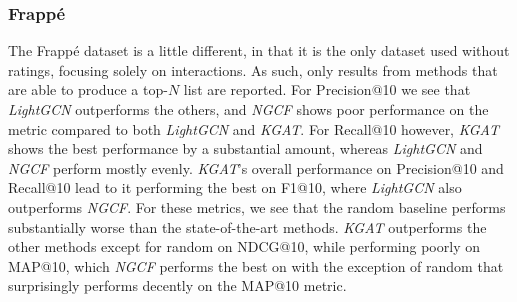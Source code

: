 \subsubsection{Frappé}
The Frappé dataset is a little different, in that it is the only dataset used without ratings, focusing solely on interactions.
As such, only results from methods that are able to produce a top-$N$ list are reported.
For Precision@10 we see that \textit{LightGCN} outperforms the others, and \textit{NGCF} shows poor performance on the metric compared to both \textit{LightGCN} and \textit{KGAT}.
For Recall@10 however, \textit{KGAT} shows the best performance by a substantial amount, whereas \textit{LightGCN} and \textit{NGCF} perform mostly evenly.
\textit{KGAT}'s overall performance on Precision@10 and Recall@10 lead to it performing the best on F1@10, where \textit{LightGCN} also outperforms \textit{NGCF}.
For these metrics, we see that the random baseline performs substantially worse than the state-of-the-art methods.
\textit{KGAT} outperforms the other methods except for random on NDCG@10, while performing poorly on MAP@10, which \textit{NGCF} performs the best on with the exception of random that surprisingly performs decently on the MAP@10 metric.

